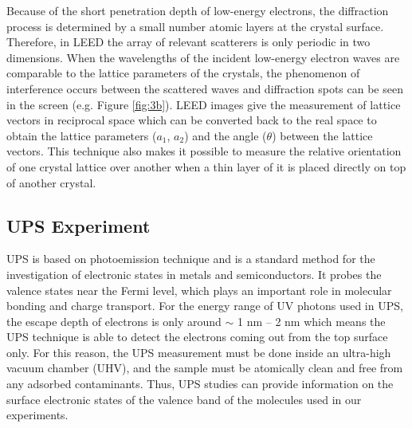 \documentclass[12pt]{article}
\begin{document}
Because of the short penetration depth of low-energy electrons, the diffraction process is determined by a small number atomic layers at the crystal surface. Therefore, in LEED the array of relevant scatterers is only periodic in two dimensions. When the wavelengths of the incident low-energy electron waves are comparable to the lattice parameters of the crystals, the phenomenon of interference occurs between the scattered waves and diffraction spots can be seen in the screen (e.g. Figure \ref{fig:3b}). LEED images give the measurement of lattice vectors in reciprocal space which can be converted back to the real space to obtain the lattice parameters ($a_1$, $a_2$) and the angle ($\theta$) between the lattice vectors. This technique also makes it possible to measure the relative orientation of one crystal lattice over another when a thin layer of it is placed directly on top of another crystal.

\subsection{UPS Experiment}

UPS is based on photoemission technique and is a standard method for the investigation of electronic states in metals and semiconductors. It probes the valence states near the Fermi level, which plays an important role in molecular bonding and charge transport. For the energy range of UV photons used in UPS, the escape depth of electrons is only around $\sim$ 1 nm – 2 nm which means the UPS technique is able to detect the electrons coming out from the top surface only. For this reason, the UPS measurement must be done inside an ultra-high vacuum chamber (UHV), and the sample must be atomically clean and free from any adsorbed contaminants. Thus, UPS studies can provide information on the surface electronic states of the valence band of the molecules used in our experiments. 
\end{document}
